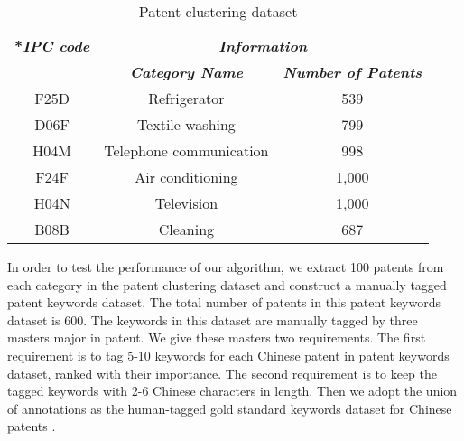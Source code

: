 \documentclass[conference]{IEEEtran}
\begin{document}
\begin{CJK}{UTF8}{gbsn}
	\renewcommand\arraystretch{2}
	\begin{table}[htbp]
		\caption{Patent clustering dataset}  
		\label{tab1}
		\begin{center}
			\begin{tabular}{|c|c|c|}
				\hline
				\textbf{\multirow{2}*{\textit{IPC code}}}&\multicolumn{2}{|c|}{\textbf{\textit{Information}}} \\ 
				\cline{2-3}
				& \textbf{\textit{Category Name}}& \textbf{\textit{Number of Patents}} \\
				\hline
				F25D & Refrigerator & 539  \\
				\hline
				D06F & Textile washing & 799  \\
				\hline
				H04M & Telephone communication & 998  \\
				\hline
				F24F & Air conditioning & 1,000  \\
				\hline
				H04N & Television & 1,000  \\
				\hline
				B08B & Cleaning & 687  \\
				\hline	
			\end{tabular}
		\end{center}
	\end{table}
	In order to test the performance of our algorithm, we extract 100 patents from each category in the patent clustering dataset and construct a manually tagged patent keywords dataset. The total number of patents in this patent keywords dataset is 600. The keywords in this dataset are manually tagged by three masters major in patent. We give these masters two requirements. The first requirement is to tag 5-10 keywords for each Chinese patent in patent keywords dataset, ranked with their importance. The second requirement is to keep the tagged keywords with 2-6 Chinese characters in length. Then we adopt the union of annotations as the human-tagged gold standard keywords dataset for Chinese patents \cite{b25}.


\end{CJK}
\end{document}
